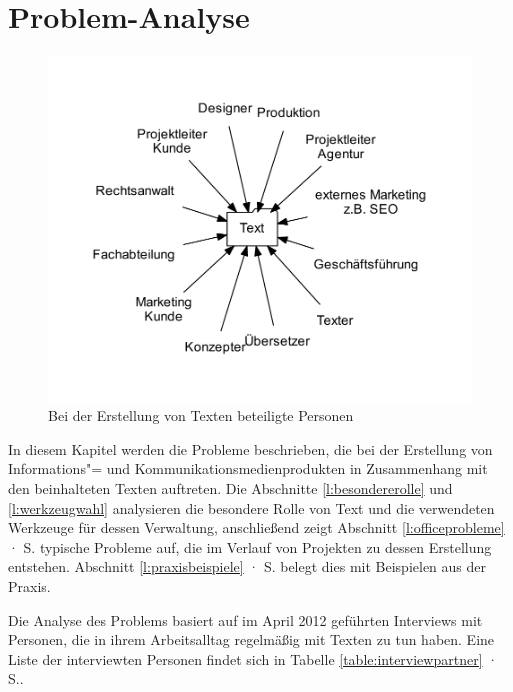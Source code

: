 \section{Problem-Analyse}\label{l:problemanalyse}

\begin{figure}[htb]
\begin{center}
\includegraphics[width=\textwidth]{media/chart-2.pdf}
\end{center}
\caption{Bei der Erstellung von Texten beteiligte Personen}
\label{chart:2}
\end{figure}

In diesem Kapitel werden die Probleme beschrieben, die bei der Erstellung von Informations"= und Kommunikationsmedienprodukten in Zusammenhang mit den beinhalteten Texten auftreten. Die Abschnitte \ref{l:besondererolle} und \ref{l:werkzeugwahl} analysieren die besondere Rolle von Text und die verwendeten Werkzeuge für dessen Verwaltung, anschließend zeigt Abschnitt \ref{l:officeprobleme} · S.\pageref{l:officeprobleme} typische Probleme auf, die im Verlauf von Projekten zu dessen Erstellung entstehen. Abschnitt \ref{l:praxisbeispiele} · S.\pageref{l:praxisbeispiele} belegt dies mit Beispielen aus der Praxis. 

\bigskip

Die Analyse des Problems basiert auf im April 2012 geführten Interviews mit Personen, die in ihrem Arbeitsalltag regelmäßig mit Texten zu tun haben. Eine Liste der interviewten Personen findet sich in Tabelle \ref{table:interviewpartner} · S.\pageref{table:interviewpartner}.

